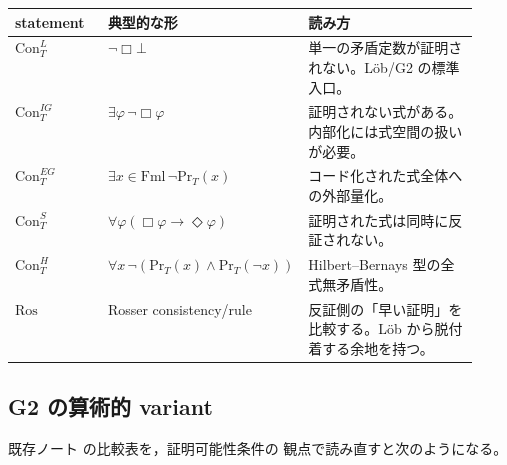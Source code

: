 ﻿\documentclass[a4paper,10pt]{ltjsarticle}
\newcommand{\Con}{\mathrm{Con}}
\newcommand{\Ros}{\mathrm{Ros}}
\newcommand{\Boxop}{\Box}
\newcommand{\Dia}{\Diamond}
\newcommand{\PrT}{\mathrm{Pr}_T}
\newcommand{\Fml}{\mathrm{Fml}}
\newcommand{\Bot}{\bot}
\begin{document}
\begin{center}
\begin{tabularx}{\linewidth}{>{\raggedright\arraybackslash}p{0.20\linewidth}
>{\raggedright\arraybackslash}p{0.34\linewidth}
>{\raggedright\arraybackslash}X}
\toprule
statement & 典型的な形 & 読み方 \\
\midrule
\(\Con_T^L\) & \(\neg\Boxop\Bot\) & 単一の矛盾定数が証明されない。Löb/G2 の標準入口。\\
\(\Con_T^{IG}\) & \(\exists\varphi\,\neg\Boxop\varphi\) & 証明されない式がある。内部化には式空間の扱いが必要。\\
\(\Con_T^{EG}\) & \(\exists x\in\Fml\,\neg\PrT(x)\) & コード化された式全体への外部量化。\\
\(\Con_T^S\) & \(\forall\varphi(\Boxop\varphi\to\Dia\varphi)\) & 証明された式は同時に反証されない。\\
\(\Con_T^H\) & \(\forall x\,\neg(\PrT(x)\land\PrT(\neg x))\) & Hilbert--Bernays 型の全式無矛盾性。\\
\(\Ros\) & Rosser consistency/rule & 反証側の「早い証明」を比較する。Löb から脱付着する余地を持つ。\\
\bottomrule
\end{tabularx}
\end{center}

\subsection{G2 の算術的 variant}

既存ノート  の比較表を，証明可能性条件の
観点で読み直すと次のようになる。
\end{document}
